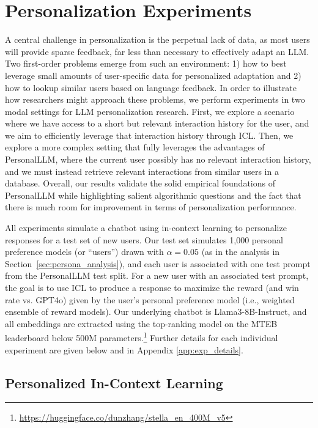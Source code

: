 \section{Personalization Experiments}\label{sec:experiments}

A central challenge in personalization is the perpetual lack of data, as most users will provide sparse feedback, far less than necessary to effectively adapt an LLM.
Two first-order problems emerge from such an environment: 1) how to best leverage small amounts of user-specific data for personalized adaptation and 2) how to lookup similar users based on language feedback.
In order to illustrate how researchers might approach these problems, we perform experiments in two modal settings for LLM personalization research.
First, we explore a scenario where we have access to a short but relevant interaction history for the user, and we aim to efficiently leverage that interaction history through ICL.  
Then, we explore a more complex setting that fully leverages the advantages of \textsf{PersonalLLM}, where the current user possibly has no relevant interaction history, and we must instead retrieve relevant interactions from similar users in a database.
Overall, our results validate the solid empirical foundations of \textsf{PersonalLLM} while highlighting salient algorithmic questions and the fact that there is much room for improvement in terms of personalization performance.

All experiments simulate a chatbot using in-context learning to personalize responses for a test set of new users.
Our test set simulates 1,000 personal preference models (or ``users'') drawn with $\alpha=0.05$ (as in the analysis in Section~\ref{sec:persona_analysis}), and each user is associated with one test prompt from the \textsf{PersonalLLM} test split.
For a new user with an associated test prompt, the goal is to use ICL to produce a response to maximize the reward (and win rate vs. GPT4o) given by the user's personal preference model (i.e., weighted ensemble of reward models).
Our underlying chatbot is Llama3-8B-Instruct, and all embeddings are extracted using the top-ranking model on the MTEB \citep{muennighoff2023mtebmassivetextembedding} leaderboard below 500M parameters.\footnote{\url{https://huggingface.co/dunzhang/stella_en_400M_v5}}
Further details for each individual experiment are given below and in Appendix \ref{app:exp_details}.

\subsection{Personalized In-Context Learning}

